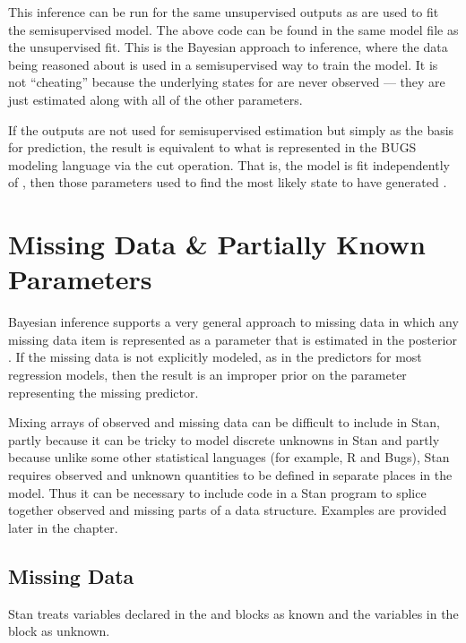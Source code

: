 This inference can be run for the same unsupervised outputs 
as are used to fit the semisupervised model.  The above code can be
found in the same model file as the unsupervised fit.  This is the
Bayesian approach to inference, where the data being reasoned about is
used in a semisupervised way to train the model.  It is not
``cheating'' because the underlying states for  are never
observed --- they are just estimated along with all of the other
parameters.

If the outputs  are not used for semisupervised estimation but
simply as the basis for prediction, the result is equivalent to what
is represented in the BUGS modeling language via the cut operation.
That is, the model is fit independently of , then those
parameters used to find the most likely state to have generated
.


\chapter{Missing Data \& Partially Known Parameters}

\noindent
Bayesian inference supports a very general approach to missing data in
which any missing data item is represented as a parameter that is
estimated in the posterior \citep{GelmanEtAl:2013}.  If the missing
data is not explicitly modeled, as in the predictors for most
regression models, then the result is an improper prior on the
parameter representing the missing predictor.

Mixing arrays of observed and missing data can be difficult to
include in Stan, partly because it can be tricky to model discrete
unknowns in Stan and partly because unlike some other statistical
languages (for example, R and Bugs), Stan requires observed and
unknown quantities to be defined in separate places in the model. Thus
it can be necessary to include code in a Stan program to splice
together observed and missing parts of a data structure.  Examples are
provided later in the chapter.

\section{Missing Data}

Stan treats variables declared in the  and
 blocks as known and the variables in the
 block as unknown.

